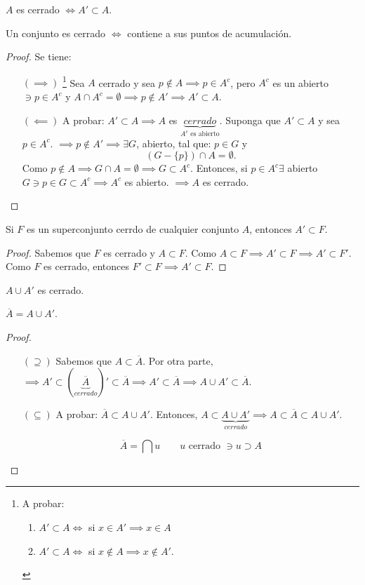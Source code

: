\begin{prop}
	$A$ es cerrado $\iff A'\subset A$.
	\begin{cajita}
		Un conjunto es cerrado $\iff$ contiene a sus puntos de acumulación.
	\end{cajita}
	\begin{proof}
		Se tiene: 
		\begin{enumerate}
			\item[$(\implies)$] \footnote{A probar: \begin{enumerate}
					\item $A'\subset A\iff$ si $x\in A'\implies x\in A$
					\item $A'\subset A\iff$ si $x\not\in A\implies x\not\in A'$. 
			\end{enumerate}}
		Sea $A$ cerrado y sea $p\not\in A\implies p\in A^c$, pero $A^c$ es un abierto $\ni p\in A^c$ y $A\cap A^c=\emptyset\implies p\not\in A'\implies A'\subset A$.
		\item[$(\impliedby)$] A probar: $A'\subset A\implies A$ es $\underbrace{cerrado}_{A^c\text{ es abierto}}$. Suponga que $A'\subset A$ y sea $p\in A^c$. $\implies p\not \in A'\implies \exists G$, abierto, tal que: $p\in G$ y $$(G-\{p\})\cap A=\emptyset.$$
		Como $p\not\in A\implies G\cap A=\emptyset \implies G\subset A^c$. Entonces, si $p\in A^c\exists$ abierto $G\ni p\in  G\subset A^c\implies A^c$ es abierto. $\implies A$ es cerrado. 
		\end{enumerate}
	\end{proof} 
\end{prop}

\begin{prop}
	Si $F$ es un superconjunto cerrdo de cualquier conjunto $A$, entonces $A'\subset F$. 
	\begin{proof}
		Sabemos que $F$ es cerrado y $A\subset F$. Como $A\subset F \implies A'\subset F\implies A'\subset F'$. Como $F$ es cerrado, entonces $F'\subset F\implies A'\subset F$. 
	\end{proof}
\end{prop}

\begin{prop}
	$A\cup A'$ es cerrado. 
\end{prop}

\begin{prop}
	$\overline{A}=A\cup A'$. 
	\begin{proof}
		\begin{enumerate}
			\item[$(\supseteq)$] Sabemos que $A\subset \overline{A}$. Por otra parte, $\implies A'\subset (\underbrace{\overline{A}}_{cerrado})'\subset \overline{A}\implies A'\subset \overline{A}\implies A\cup A'\subset \overline{A}$. 
			\item[$(\subseteq)$] A probar: $\overline{A}\subset A\cup A'$. Entonces, $A\subset \underbrace{A\cup A'}_{cerrado}\implies A\subset \overline{A}\subset A\cup A'$. 
			\begin{cajita}
				$$\overline{A}=\bigcap u\qquad \text{$u$ cerrado $\ni u\supset A$}$$
			\end{cajita}
		\end{enumerate}
	\end{proof}
\end{prop}

